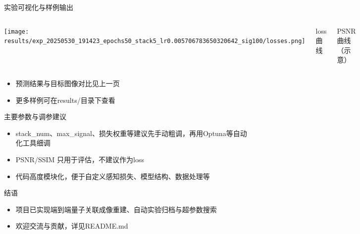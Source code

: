 \documentclass{beamer}
\begin{document}
\begin{frame}{实验可视化与样例输出}
\begin{columns}
\texttt{[image: results/exp\_20250530\_191423\_epochs50\_stack5\_lr0.005706783650320642\_sig100/losses.png]}
\centerline{\small loss曲线}
\centerline{\small PSNR曲线（示意）}
\end{columns}
\vspace{0.5em}
\begin{itemize}
    \item 预测结果与目标图像对比见上一页
    \item 更多样例可在results/目录下查看
\end{itemize}
\end{frame}

\begin{frame}{主要参数与调参建议}
\begin{itemize}
    \item stack\_num、max\_signal、损失权重等建议先手动粗调，再用Optuna等自动化工具细调
    \item PSNR/SSIM 只用于评估，不建议作为loss
    \item 代码高度模块化，便于自定义感知损失、模型结构、数据处理等
\end{itemize}
\end{frame}

\begin{frame}{结语}
\begin{itemize}
    \item 项目已实现端到端量子关联成像重建、自动实验归档与超参数搜索
    \item 欢迎交流与贡献，详见README.md
\end{itemize}
\end{frame}
\end{document}
